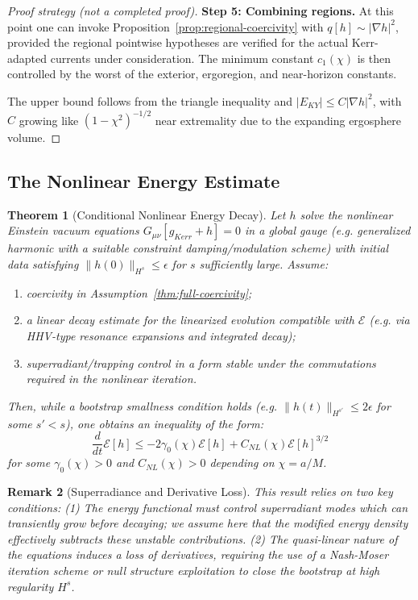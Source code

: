 \documentclass[12pt,a4paper]{article}
\newtheorem{theorem}{Theorem}[section]
\newtheorem{remark}[theorem]{Remark}
\begin{document}
\begin{proof}[Proof strategy (not a completed proof)]
\textbf{Step 5: Combining regions.}
At this point one can invoke Proposition~\ref{prop:regional-coercivity} with $q[h]\sim |\nabla h|^2$, provided the regional pointwise hypotheses are verified for the actual Kerr-adapted currents under consideration. The minimum constant $c_1(\chi)$ is then controlled by the worst of the exterior, ergoregion, and near-horizon constants.

The upper bound follows from the triangle inequality and $|E_{KY}| \leq C |\nabla h|^2$, with $C$ growing like $(1-\chi^2)^{-1/2}$ near extremality due to the expanding ergosphere volume.
\end{proof}

\subsection{The Nonlinear Energy Estimate}

\begin{theorem}[Conditional Nonlinear Energy Decay]\label{thm:nonlinear-energy-decay}
Let $h$ solve the nonlinear Einstein vacuum equations $G_{\mu\nu}[g_{Kerr} + h] = 0$ in a global gauge (e.g. generalized harmonic with a suitable constraint damping/modulation scheme) with initial data satisfying $\|h(0)\|_{H^s} \leq \epsilon$ for $s$ sufficiently large. Assume:
\begin{enumerate}
    \item coercivity in Assumption~\ref{thm:full-coercivity};
    \item a linear decay estimate for the linearized evolution compatible with $\mathcal{E}$ (e.g. via HHV-type resonance expansions and integrated decay);
    \item superradiant/trapping control in a form stable under the commutations required in the nonlinear iteration.
\end{enumerate}
Then, while a bootstrap smallness condition holds (e.g. $\|h(t)\|_{H^{s'}} \leq 2\epsilon$ for some $s' < s$), one obtains an inequality of the form:
\begin{equation}\label{eq:nonlinear-decay}
\frac{d}{dt}\mathcal{E}[h] \leq -2\gamma_0(\chi) \mathcal{E}[h] + C_{NL}(\chi) \mathcal{E}[h]^{3/2}
\end{equation}
for some $\gamma_0(\chi) > 0$ and $C_{NL}(\chi) > 0$ depending on $\chi=a/M$.
\end{theorem}

\begin{remark}[Superradiance and Derivative Loss]\label{rmk:nonlinear-issues}
This result relies on two key conditions: (1) The energy functional must control superradiant modes which can transiently grow before decaying; we assume here that the modified energy density effectively subtracts these unstable contributions. (2) The quasi-linear nature of the equations induces a loss of derivatives, requiring the use of a Nash-Moser iteration scheme or null structure exploitation to close the bootstrap at high regularity $H^s$.
\end{remark}
\end{document}
